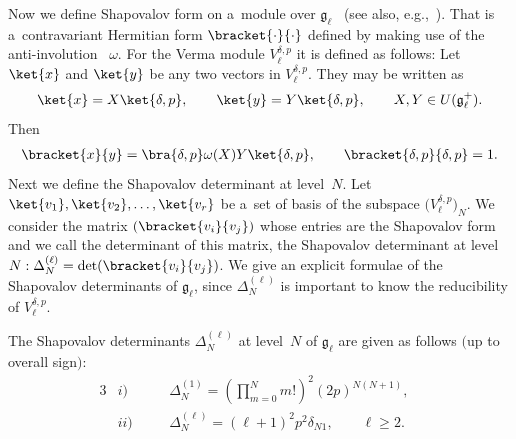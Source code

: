 \documentclass[pdftex]{sigma}
\numberwithin{equation}{section}
\begin{document}
Now we def\/ine Shapovalov form on a~module over $ {\mathfrak g}_{\ell} $~\cite{Shapo} (see also, e.g.,~\cite{KacRai}).
That is a~contravariant Hermitian form $ \bracket{\cdot}{\cdot} $ def\/ined by making use of the anti-involution~ $\omega$.
For the Verma module $ V^{\delta,p}_{\ell} $ it is def\/ined as follows:   Let $ \ket{x} $ and $ \ket{y} $ be any two
vectors in $ V^{\delta,p}_{\ell}$.
They may be written as
\begin{gather*}
\ket{x} = X \ket{\delta,p},
\qquad
\ket{y} = Y \ket{\delta,p},
\qquad
X, Y \in U({\mathfrak g}_{\ell}^+).
\end{gather*}
Then
\begin{gather}
\bracket{x}{y} = \bra{\delta,p} \omega(X) Y \ket{\delta,p},
\qquad
\bracket{\delta,p}{\delta,p} = 1.
\label{innerprod-def}
\end{gather}
Next we def\/ine the Shapovalov determinant at level~$N$.
Let $ \ket{v_1}, \ket{v_2}, \dots, \ket{v_r} $ be a~set of basis of the subspace $ \big(V^{\delta,p}_{\ell}\big)_N$.
We consider the matrix $ (\bracket{v_i}{v_j}) $ whose entries are     the Shapovalov form and we call the determinant of
this matrix, the Shapovalov determinant at level $N: \Delta^{(\ell)}_N = \det (\bracket{v_i}{v_j})$.
We give an explicit formulae of the Shapovalov determinants of $ {\mathfrak g}_{\ell}$, since $ \Delta^{(\ell)}_N $ is
important to know the reducibility of $V^{\delta,p}_{\ell}$.
\begin{proposition}\label{prop1}
The Shapovalov determinants $ \Delta^{(\ell)}_N$ at level~$N$ of ${\mathfrak g}_{\ell}$ are given as follows $($up to
overall sign$)$:
\begin{alignat}{3}
   & i)
\quad &&
\Delta_N^{(1)} = \left(\prod\limits_{m=0}^N m! \right)^2 (2p)^{N(N+1)},&
\label{KDl1}
\\
  &   ii)
\quad &&
\Delta^{(\ell)}_N = (\ell+1)^2   p^2   \delta_{N1},
\qquad
\ell \geq 2.&
\end{alignat}
\end{proposition}
\end{document}

